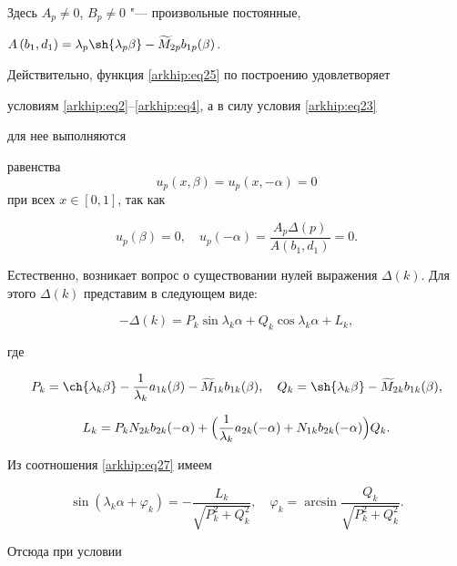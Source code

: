 Здесь $A_{p}\neq{0}$, $B_{p}\neq{0}$ "--- произвольные  постоянные,

$A\left(b_{1}, d_{1}\right)=\lambda_{p}\sh {\lambda_{p} \beta} - \widetilde M_{2 p} b_{1

p}(\beta)$.





Действительно, функция \eqref{arkhip:eq25} по построению удовлетворяет

условиям \eqref{arkhip:eq2}--\eqref{arkhip:eq4}, а в силу условия \eqref{arkhip:eq23}

 для нее выполняются

равенства $$u_{p}\left({x,\beta}\right) = u_{p}\left({x,-\alpha}\right) =

0$$ при всех $x\in[0, 1]$, так как

$$u_{p}(\beta) = 0, \quad  u_{p}\left({-\alpha}\right) = \displaystyle\frac{A_{p}\Delta \left(p\right)}{A\left(b_{1}, d_{1}\right)} = 0.$$



Естественно, возникает вопрос о существовании нулей выражения $\Delta (k)$. Для этого  $\Delta (k)$ представим в следующем виде:

\begin{equation}\label{arkhip:eq27}

 - \Delta (k) = P_{k}\sin{\lambda_{k} \alpha} + Q_{k}\cos{\lambda_{k} \alpha} + L_{k},

\end{equation}

где

$$P_{k} = \ch {\lambda_{k} \beta} - \frac{1}{\lambda_{k}}a_{1 k}(\beta) - \widetilde M_{1 k}b_{1 k}(\beta), \quad 

Q_{k} = \sh{\lambda_{k} \beta} - \widetilde M_{2 k}b_{1 k}(\beta),$$

$$L_{k} = P_{k}N_{2 k}b_{2 k}(-\alpha) + \Bigl(\frac{1}{\lambda_{k}}a_{2 k}(-\alpha) + N_{1 k}b_{2 k}(-\alpha)\Bigr)Q_{k}.$$

Из соотношения \eqref{arkhip:eq27} имеем

\begin{equation}\label{arkhip:eq28}

\sin{\left(\lambda_{k}\alpha + \varphi_{k}\right)} = -\frac{L_{k}}{\sqrt{P_{k}^2 + Q_{k}^2}},\quad  \varphi_{k} = \arcsin\displaystyle\frac{Q_{k}}{\sqrt{P_{k}^2 + Q_{k}^2}}.

\end{equation}

Отсюда при условии

